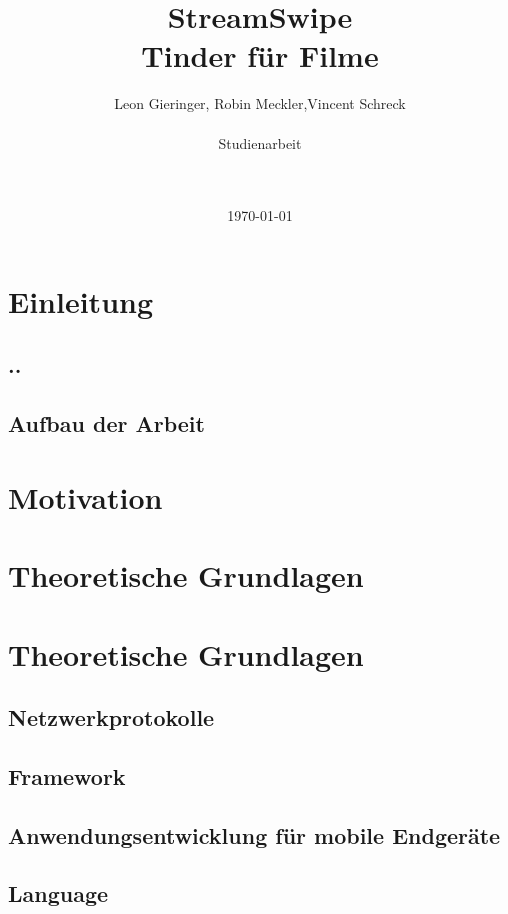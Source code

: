 \documentclass[11pt,a4paper]{article}
\title{StreamSwipe\\Tinder für Filme\vspace{10px}}
\author{Leon Gieringer, Robin Meckler,Vincent Schreck \\ \\ Studienarbeit \\ \\ \\}
\date{\today}
\begin{document}
\maketitle
\thispagestyle{empty}
\newpage
{}
\tableofcontents
\newpage
\listoffigures
\newpage
{}

\pagestyle{fancy}
\fancyhf{}
\setlength{\headheight}{35pt}
\cfoot{\thepage}
\newpage


\section{Einleitung}
\subsection{..}
\subsection{Aufbau der Arbeit}

\section{Motivation}

\newpage
\section{Theoretische Grundlagen}
\newpage
\section{Theoretische Grundlagen}
\subsection{Netzwerkprotokolle}

\newpage
\subsection{Framework}

\subsection{Anwendungsentwicklung für mobile Endgeräte}

\subsection{Language}

\end{document}
